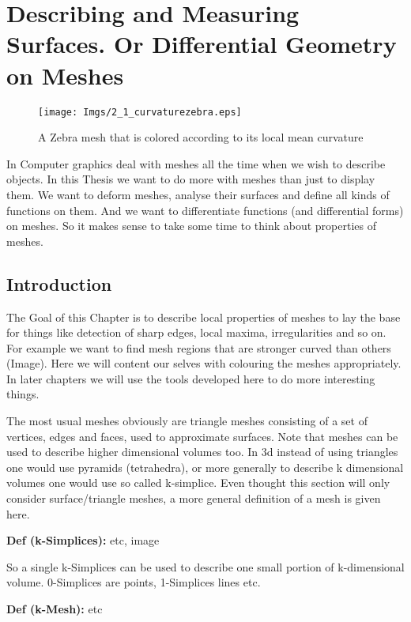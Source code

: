 \chapter{Describing and Measuring Surfaces. Or Differential Geometry on Meshes}
	
	\begin{figure}[ht]
	\begin{center}
	\texttt{[image: Imgs/2\_1\_curvaturezebra.eps]}
	\end{center}
	\caption{A Zebra mesh that is colored according to its local mean curvature}
	\end{figure}
	
	In Computer graphics deal with meshes all the time when we wish to describe objects. In this Thesis we want to do more with meshes than just to display them. We want to deform meshes, analyse their surfaces and define all kinds of functions on them. And we want to differentiate functions (and differential forms) on meshes. So it makes sense to take some time to think about properties of meshes.	
	
\section{Introduction}
	The Goal of this Chapter is to describe local properties of meshes to lay the base for things like detection of sharp edges, local maxima, irregularities and so on. For example we want to find mesh regions that are stronger curved than others (Image). Here we will content our selves with colouring the meshes appropriately. In later chapters we will use the tools developed here to do more interesting things.
	
	The most usual meshes obviously are triangle meshes consisting of a set of vertices, edges and faces, used to approximate surfaces. Note that meshes can be used to describe higher dimensional volumes too. In 3d instead of using triangles one would use pyramids (tetrahedra), or more generally to describe k dimensional volumes one would use so called k-simplice. Even thought this section will only consider surface/triangle meshes, a more general definition of a mesh is given here.
	
	\textbf{Def (k-Simplices):} etc, image
	
So a single k-Simplices	can be used to describe one small portion of k-dimensional volume. 0-Simplices are points, 1-Simplices lines etc.
	
	\textbf{Def (k-Mesh):} etc
	
